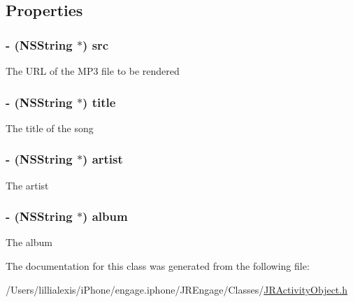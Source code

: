\subsection{Properties}
\hypertarget{interface_j_r_mp3_media_object_ae6ae676c1841834aba74a2c5d11cb54c}{
\subsubsection[{src}]{\setlength{\rightskip}{0pt plus 5cm}-\/ (NSString $\ast$) src}}
\label{interface_j_r_mp3_media_object_ae6ae676c1841834aba74a2c5d11cb54c}
The URL of the MP3 file to be rendered \hypertarget{interface_j_r_mp3_media_object_accd252e22f704fd4b314217317f0b5cb}{
\subsubsection[{title}]{\setlength{\rightskip}{0pt plus 5cm}-\/ (NSString $\ast$) title}}
\label{interface_j_r_mp3_media_object_accd252e22f704fd4b314217317f0b5cb}
The title of the song \hypertarget{interface_j_r_mp3_media_object_aa164b3ecc14b03d36f5093d3d4d7f5b1}{
\subsubsection[{artist}]{\setlength{\rightskip}{0pt plus 5cm}-\/ (NSString $\ast$) artist}}
\label{interface_j_r_mp3_media_object_aa164b3ecc14b03d36f5093d3d4d7f5b1}
The artist \hypertarget{interface_j_r_mp3_media_object_adefc6578183aa09a492b229696f581df}{
\subsubsection[{album}]{\setlength{\rightskip}{0pt plus 5cm}-\/ (NSString $\ast$) album}}
\label{interface_j_r_mp3_media_object_adefc6578183aa09a492b229696f581df}
The album 

The documentation for this class was generated from the following file:\begin{DoxyCompactItemize}
\item 
/Users/lillialexis/iPhone/engage.iphone/JREngage/Classes/\hyperlink{_j_r_activity_object_8h}{JRActivityObject.h}\end{DoxyCompactItemize}
